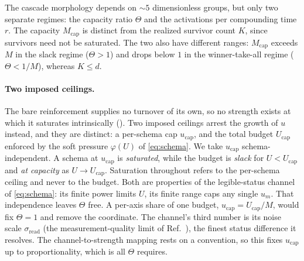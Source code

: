 \documentclass[
  aps,prx,
  reprint,
  superscriptaddress,
  nofootinbib,
  longbibliography
]{revtex4-2}
\newcommand{\sread}{\sigma_{\mathrm{read}}}
\newcommand{\smref}[1]{\cite[Sec.~#1]{SM}}
\begin{document}
The cascade morphology depends on $\sim5$ dimensionless groups, but only two separate regimes: the capacity ratio $\Theta$ and the activations per compounding time $r$. The capacity $M_{\mathrm{cap}}$ is distinct from the realized survivor count $K$, since survivors need not be saturated. The two also have different ranges: $M_{\mathrm{cap}}$ exceeds $M$ in the slack regime ($\Theta>1$) and drops below $1$ in the winner-take-all regime ($\Theta<1/M$), whereas $K\le d$.

\paragraph{Two imposed ceilings.} The bare reinforcement supplies no turnover of its own, so no strength exists at which it saturates intrinsically (\smref{S6}). Two imposed ceilings arrest the growth of $u$ instead, and they are distinct: a per-schema cap $u_{\mathrm{cap}}$, and the total budget $U_{\mathrm{cap}}$ enforced by the soft pressure $\varphi(U)$ of \cref{eq:schema}. We take $u_{\mathrm{cap}}$ schema-independent. A schema at $u_{\mathrm{cap}}$ is \emph{saturated}, while the budget is \emph{slack} for $U<U_{\mathrm{cap}}$ and \emph{at capacity} as $U\to U_{\mathrm{cap}}$. Saturation throughout refers to the per-schema ceiling and never to the budget. Both are properties of the legible-status channel of \cref{eq:schema}: its finite power limits $U$, its finite range caps any single $u_m$. That independence leaves $\Theta$ free. A per-axis share of one budget, $u_{\mathrm{cap}}=U_{\mathrm{cap}}/M$, would fix $\Theta=1$ and remove the coordinate. The channel's third number is its noise scale $\sread$ (the measurement-quality limit of Ref.~\cite{Castro2026}), the finest status difference it resolves. The channel-to-strength mapping rests on a convention, so this fixes $u_{\mathrm{cap}}$ up to proportionality, which is all $\Theta$ requires.
\end{document}
